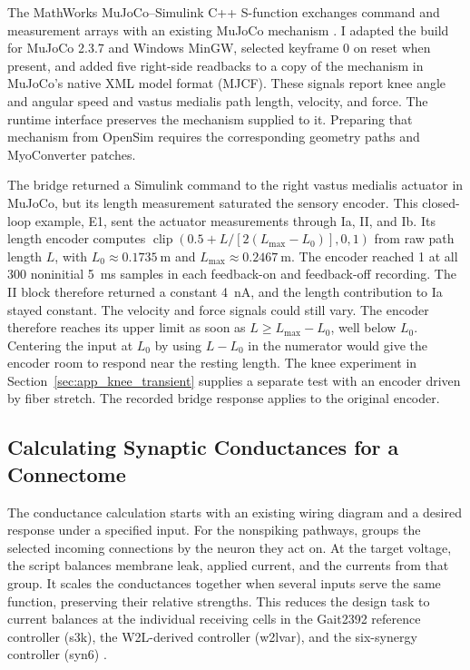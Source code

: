 The MathWorks MuJoCo--Simulink C++ S-function exchanges command and measurement arrays with an existing MuJoCo mechanism \citep{mathworks_mujoco_blockset}. I adapted the build for MuJoCo 2.3.7 and Windows MinGW, selected keyframe 0 on reset when present, and added five right-side readbacks to a copy of the mechanism in MuJoCo's native XML model format (MJCF). These signals report knee angle and angular speed and vastus medialis path length, velocity, and force. The runtime interface preserves the mechanism supplied to it. Preparing that mechanism from OpenSim requires the corresponding geometry paths and MyoConverter patches.

The bridge returned a Simulink command to the right vastus medialis actuator in MuJoCo, but its length measurement saturated the sensory encoder. This closed-loop example, E1, sent the actuator measurements through Ia, II, and Ib. Its length encoder computes $\operatorname{clip}\!\left(0.5+L/[2(L_{\max}-L_0)],0,1\right)$ from raw path length $L$, with $L_0\approx\qty{0.1735}{\meter}$ and $L_{\max}\approx\qty{0.2467}{\meter}$. The encoder reached 1 at all 300 noninitial \qty{5}{\milli\second} samples in each feedback-on and feedback-off recording. The II block therefore returned a constant \qty{4}{\nano\ampere}, and the length contribution to Ia stayed constant. The velocity and force signals could still vary. The encoder therefore reaches its upper limit as soon as $L\geq L_{\max}-L_0$, well below $L_0$. Centering the input at $L_0$ by using $L-L_0$ in the numerator would give the encoder room to respond near the resting length. The knee experiment in Section~\ref{sec:app_knee_transient} supplies a separate test with an encoder driven by fiber stretch. The recorded bridge response applies to the original encoder.

\subsection{Calculating Synaptic Conductances for a Connectome}\label{sec:app_fsa_design}

The conductance calculation starts with an existing wiring diagram and a desired response under a specified input. For the nonspiking pathways,  groups the selected incoming connections by the neuron they act on. At the target voltage, the script balances membrane leak, applied current, and the currents from that group. It scales the conductances together when several inputs serve the same function, preserving their relative strengths. This reduces the design task to current balances at the individual receiving cells in the Gait2392 reference controller (s3k), the W2L-derived controller (w2lvar), and the six-synergy controller (syn6) \citep{szczecinski_functional_2017}.

